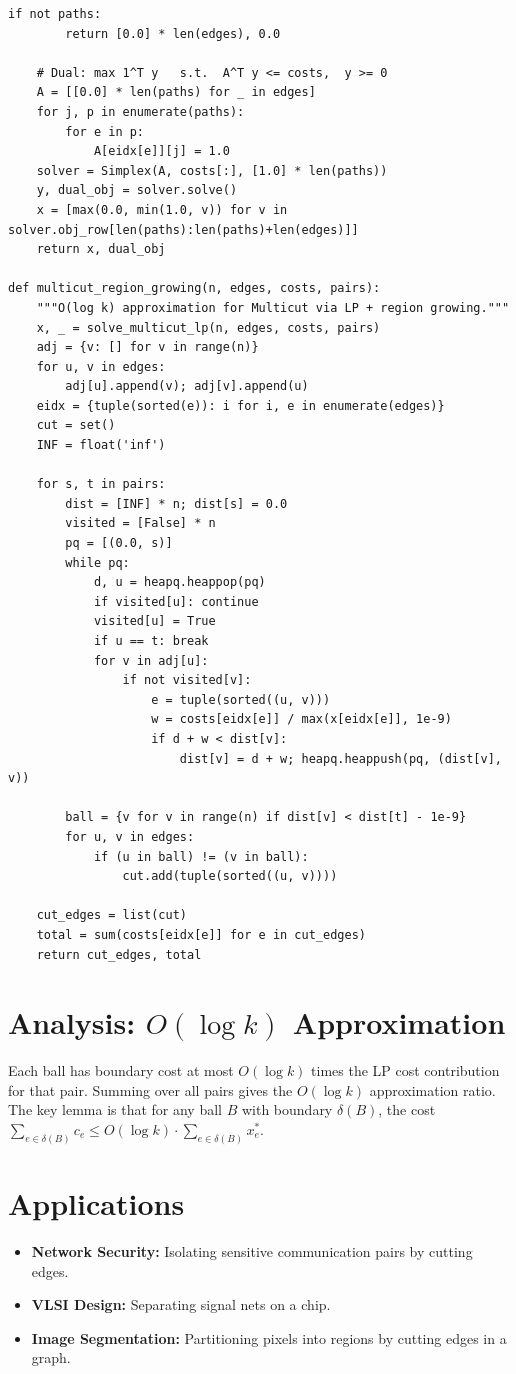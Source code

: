 \begin{lstlisting}[style=python, caption=Multicut in General Graphs — Region Growing]
    if not paths:
        return [0.0] * len(edges), 0.0

    # Dual: max 1^T y   s.t.  A^T y <= costs,  y >= 0
    A = [[0.0] * len(paths) for _ in edges]
    for j, p in enumerate(paths):
        for e in p:
            A[eidx[e]][j] = 1.0
    solver = Simplex(A, costs[:], [1.0] * len(paths))
    y, dual_obj = solver.solve()
    x = [max(0.0, min(1.0, v)) for v in solver.obj_row[len(paths):len(paths)+len(edges)]]
    return x, dual_obj

def multicut_region_growing(n, edges, costs, pairs):
    """O(log k) approximation for Multicut via LP + region growing."""
    x, _ = solve_multicut_lp(n, edges, costs, pairs)
    adj = {v: [] for v in range(n)}
    for u, v in edges:
        adj[u].append(v); adj[v].append(u)
    eidx = {tuple(sorted(e)): i for i, e in enumerate(edges)}
    cut = set()
    INF = float('inf')

    for s, t in pairs:
        dist = [INF] * n; dist[s] = 0.0
        visited = [False] * n
        pq = [(0.0, s)]
        while pq:
            d, u = heapq.heappop(pq)
            if visited[u]: continue
            visited[u] = True
            if u == t: break
            for v in adj[u]:
                if not visited[v]:
                    e = tuple(sorted((u, v)))
                    w = costs[eidx[e]] / max(x[eidx[e]], 1e-9)
                    if d + w < dist[v]:
                        dist[v] = d + w; heapq.heappush(pq, (dist[v], v))

        ball = {v for v in range(n) if dist[v] < dist[t] - 1e-9}
        for u, v in edges:
            if (u in ball) != (v in ball):
                cut.add(tuple(sorted((u, v))))

    cut_edges = list(cut)
    total = sum(costs[eidx[e]] for e in cut_edges)
    return cut_edges, total
\end{lstlisting}

\section{Analysis: $O(\log k)$ Approximation}
Each ball has boundary cost at most $O(\log k)$ times the LP cost contribution for that pair. Summing over all pairs gives the $O(\log k)$ approximation ratio. The key lemma is that for any ball $B$ with boundary $\delta(B)$, the cost $\sum_{e \in \delta(B)} c_e \le O(\log k) \cdot \sum_{e \in \delta(B)} x_e^*$.

\section{Applications}
\begin{itemize}
    \item \textbf{Network Security:} Isolating sensitive communication pairs by cutting edges.
    \item \textbf{VLSI Design:} Separating signal nets on a chip.
    \item \textbf{Image Segmentation:} Partitioning pixels into regions by cutting edges in a graph.
\end{itemize}


